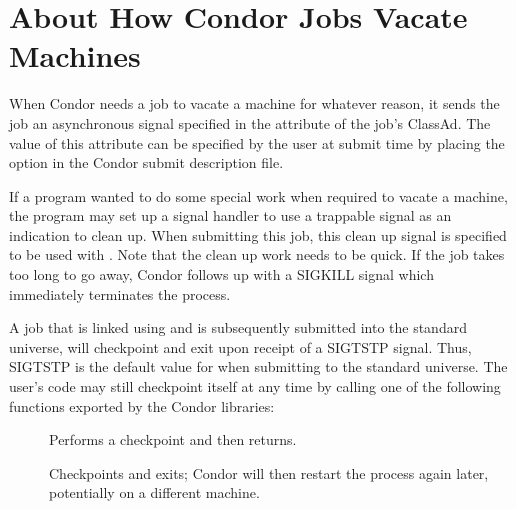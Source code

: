 






\section{\label{sec:Vacate-Explained}
About How Condor Jobs Vacate Machines}

When Condor needs a job to vacate a machine for whatever reason, it
sends the job an asynchronous signal specified in the 
attribute of the job's ClassAd.
The value of this attribute can be specified by
the user at submit time by placing the  option in the
Condor submit description file.  

If a program wanted to do some special work when required
to vacate a machine, the program may set up a
signal handler to use a trappable signal as an indication
to clean up.
When submitting this job, this clean up signal is specified to be used with
.
Note that the clean up work needs to be quick.
If the job takes too long to go away, Condor
follows up with a SIGKILL signal which immediately terminates the
process.

A job that is linked using 
and is subsequently submitted into the standard universe, 
will checkpoint and exit upon receipt of a SIGTSTP signal.
Thus, SIGTSTP is
the default value for  when submitting to the standard
universe.
The user's code may still checkpoint itself at any time
by calling one of the following functions exported by the Condor libraries:
\begin{description}
\item[] Performs a checkpoint and then returns.
\item[] Checkpoints and exits; Condor will then
restart the process again later, potentially on a different machine.
\end{description}

